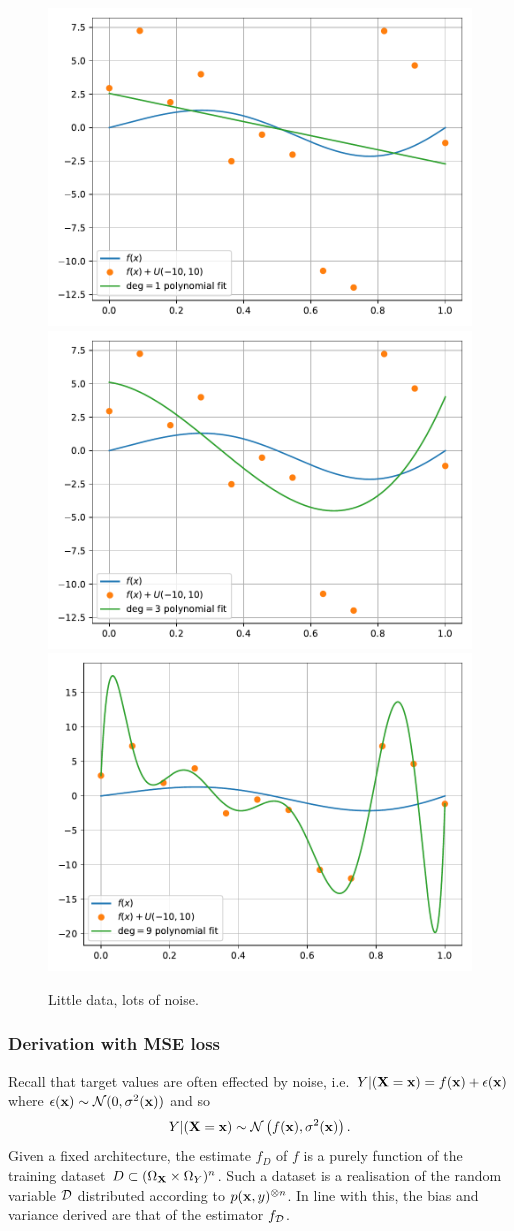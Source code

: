 \documentclass[11pt]{article}
\begin{document}
\begin{figure}[t]
    \centering
    \includegraphics[width=0.32\columnwidth]{./figures/supervised_learning/fitting_over_M=1.pdf}
    \includegraphics[width=0.32\columnwidth]{./figures/supervised_learning/fitting_over_M=3.pdf}
    \includegraphics[width=0.32\columnwidth]{./figures/supervised_learning/fitting_over_M=9.pdf}
    \caption{Little data, lots of noise.}
    \label{fig:fitting_over}
\end{figure}

\subsubsection{Derivation with MSE loss}
Recall that target values are often effected by noise, i.e. $Y|(\mathbf{X}=\mathbf{x})=f(\mathbf{x})+\epsilon(\mathbf{x})$ where $\epsilon(\mathbf{x})\sim\mathcal{N}(0,\sigma^2(\mathbf{x}))$ and so
$$
Y|(\mathbf{X}=\mathbf{x})
\sim
\mathcal{N}\left(f(\mathbf{x}), \sigma^2(\mathbf{x})\right).
$$
Given a fixed architecture, the estimate $\hat{f}_D$ of $f$ is a purely function of the training dataset $D\subset(\Omega_{\mathbf{X}}\times\Omega_Y)^n$. Such a dataset is a realisation of the random variable $\mathcal{D}$ distributed according to $p(\mathbf{x},y)^{\otimes n}$. In line with this, the bias and variance derived are that of the estimator $f_{\mathcal{D}}$.
\end{document}
